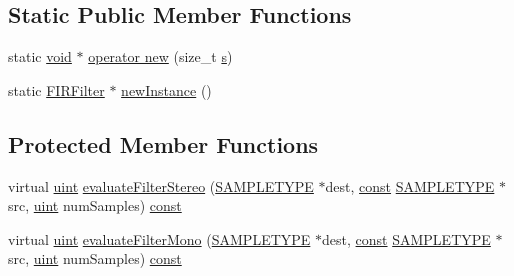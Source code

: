 \subsection*{Static Public Member Functions}
\begin{DoxyCompactItemize}
\item 
static \hyperlink{sound_8c_ae35f5844602719cf66324f4de2a658b3}{void} $\ast$ \hyperlink{classsoundtouch_1_1_f_i_r_filter_a119eb1b1b79779fc772a0f30e55ea5a1}{operator new} (size\+\_\+t \hyperlink{lib_2expat_8h_a755339d27872b13735c2cab829e47157}{s})
\item 
static \hyperlink{classsoundtouch_1_1_f_i_r_filter}{F\+I\+R\+Filter} $\ast$ \hyperlink{classsoundtouch_1_1_f_i_r_filter_a8aff233332b85a6e3e182150b0c50e1c}{new\+Instance} ()
\end{DoxyCompactItemize}
\subsection*{Protected Member Functions}
\begin{DoxyCompactItemize}
\item 
virtual \hyperlink{_s_t_types_8h_a91ad9478d81a7aaf2593e8d9c3d06a14}{uint} \hyperlink{classsoundtouch_1_1_f_i_r_filter_af9bb0383d7c16b128cda2be308e05ee4}{evaluate\+Filter\+Stereo} (\hyperlink{namespacesoundtouch_a97cfd29a7abb4d4b2a72f803d5b5850c}{S\+A\+M\+P\+L\+E\+T\+Y\+PE} $\ast$dest, \hyperlink{getopt1_8c_a2c212835823e3c54a8ab6d95c652660e}{const} \hyperlink{namespacesoundtouch_a97cfd29a7abb4d4b2a72f803d5b5850c}{S\+A\+M\+P\+L\+E\+T\+Y\+PE} $\ast$src, \hyperlink{_s_t_types_8h_a91ad9478d81a7aaf2593e8d9c3d06a14}{uint} num\+Samples) \hyperlink{getopt1_8c_a2c212835823e3c54a8ab6d95c652660e}{const} 
\item 
virtual \hyperlink{_s_t_types_8h_a91ad9478d81a7aaf2593e8d9c3d06a14}{uint} \hyperlink{classsoundtouch_1_1_f_i_r_filter_a9cb4d800241c5857895243d78608a5dc}{evaluate\+Filter\+Mono} (\hyperlink{namespacesoundtouch_a97cfd29a7abb4d4b2a72f803d5b5850c}{S\+A\+M\+P\+L\+E\+T\+Y\+PE} $\ast$dest, \hyperlink{getopt1_8c_a2c212835823e3c54a8ab6d95c652660e}{const} \hyperlink{namespacesoundtouch_a97cfd29a7abb4d4b2a72f803d5b5850c}{S\+A\+M\+P\+L\+E\+T\+Y\+PE} $\ast$src, \hyperlink{_s_t_types_8h_a91ad9478d81a7aaf2593e8d9c3d06a14}{uint} num\+Samples) \hyperlink{getopt1_8c_a2c212835823e3c54a8ab6d95c652660e}{const} 
\end{DoxyCompactItemize}
